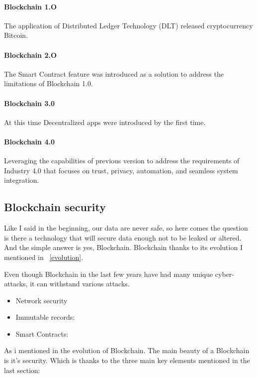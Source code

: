 \documentclass[10pt,english,a4paper]{article}
\begin{document}
\paragraph{Blockchain 1.O}
The application of Distributed Ledger Technology (DLT) released cryptocurrency Bitcoin.
\cite{Suroso:SKCK}
\paragraph{Blockchain 2.O}
The Smart Contract feature was introduced as a solution to address the limitations of Blockchain 1.0.
\cite{Suroso:SKCK}
\paragraph{Blockchain 3.0}
At this time Decentralized apps were introduced by the first time. 
\cite{Suroso:SKCK}
\paragraph{Blockchain 4.0}
Leveraging the capabilities of previous version to address the requirements of Industry 4.0 that focuses on trust, privacy, automation, and seamless system integration.
\cite{Suroso:SKCK}

\subsection{Blockchain security} %
Like I said in the beginning, our data are never safe, so here comes the question is there a technology that will secure data enough not to be leaked or altered. And the simple answer is yes, Blockchain. Blockchain thanks to its evolution I mentioned in ~\ref{evolution}.

Even though Blockchain in the last few years have had many unique cyber-attacks, it can withstand various attacks. 
\begin{itemize}
    \item Network security
    \item Immutable records:
    \item Smart Contracts:
\end{itemize}
   
\cite{Xiaofen:Blockchain-security}

As i mentioned in the evolution of Blockchain. The main beauty of a Blockchain is it's security. Which is thanks to the three main key elements mentioned in the last section:
\end{document}
